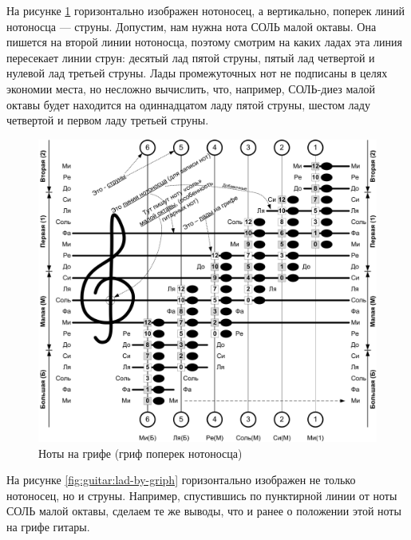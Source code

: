 На рисунке \ref{fig:guitar:lad-by-notes} горизонтально изображен нотоносец, а вертикально, поперек линий нотоносца --- струны. Допустим, нам нужна нота СОЛЬ малой октавы. Она пишется на второй линии нотоносца, поэтому смотрим на каких ладах эта линия пересекает линии струн: десятый лад пятой струны, пятый лад четвертой и нулевой лад третьей струны. Лады промежуточных нот не подписаны в целях экономии места, но несложно вычислить, что, например, СОЛЬ-диез малой октавы будет находится на одиннадцатом ладу пятой струны, шестом ладу четвертой и первом ладу третьей струны.
 
\begin{figure}[!ht]
    \centering
    \includegraphics[width=\textwidth]{fig/lad-by-notes} 
    \caption{Ноты на грифе (гриф поперек нотоносца)}\label{fig:guitar:lad-by-notes}
\end{figure} 

На рисунке \ref{fig:guitar:lad-by-griph} горизонтально изображен не только нотоносец, но и струны. Например, спустившись по пунктирной линии от ноты СОЛЬ малой октавы, сделаем те же выводы, что и ранее о положении этой ноты на грифе гитары. 

